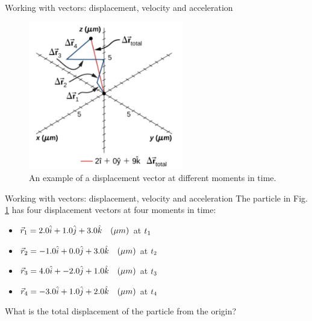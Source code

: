 \documentclass{beamer}
\begin{document}
\begin{frame}{Working with vectors: displacement, velocity and acceleration}
\begin{figure}
\centering
\includegraphics[width=0.6\textwidth,trim=0cm 2cm 0cm 0cm,clip=true]{figures/Brownian.png}
\caption{\label{fig:brown} An example of a displacement vector at different moments in time.}
\end{figure}
\end{frame}

\begin{frame}{Working with vectors: displacement, velocity and acceleration}
The particle in Fig. \ref{fig:brown} has four displacement vectors at four moments in time:
\begin{itemize}
\item $\vec{r}_{\rm 1} = 2.0\hat{i} + 1.0\hat{j} + 3.0\hat{k}\quad(\mu m)$ at $t_{\rm 1}$
\item $\vec{r}_{\rm 2} = -1.0\hat{i} + 0.0\hat{j} + 3.0\hat{k}\quad(\mu m)$ at $t_{\rm 2}$
\item $\vec{r}_{\rm 3} = 4.0\hat{i} + -2.0\hat{j} + 1.0\hat{k}\quad(\mu m)$ at $t_{\rm 3}$
\item $\vec{r}_{\rm 4} = -3.0\hat{i} + 1.0\hat{j} + 2.0\hat{k}\quad(\mu m)$ at $t_{\rm 4}$
\end{itemize}
What is the total displacement of the particle from the origin?
\end{frame}
\end{document}
